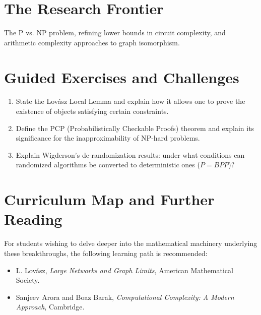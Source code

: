 \section{The Research Frontier}
The P vs. NP problem, refining lower bounds in circuit complexity, and arithmetic complexity approaches to graph isomorphism.

\section{Guided Exercises and Challenges}
\begin{enumerate}[label=\textbf{\arabic*.}]
  \item State the Lov\'asz Local Lemma and explain how it allows one to prove the existence of objects satisfying certain constraints.
  \item Define the PCP (Probabilistically Checkable Proofs) theorem and explain its significance for the inapproximability of NP-hard problems.
  \item Explain Wigderson's de-randomization results: under what conditions can randomized algorithms be converted to deterministic ones ($P = BPP$)?
\end{enumerate}

\section{Curriculum Map and Further Reading}
For students wishing to delve deeper into the mathematical machinery underlying these breakthroughs, the following learning path is recommended:
\begin{itemize}
  \item L. Lov\'asz, \emph{Large Networks and Graph Limits}, American Mathematical Society.
  \item Sanjeev Arora and Boaz Barak, \emph{Computational Complexity: A Modern Approach}, Cambridge.
\end{itemize}


